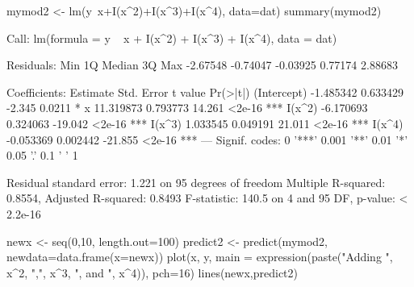 \begin{Schunk}
\begin{Sinput}
 mymod2 <- lm(y~x+I(x^2)+I(x^3)+I(x^4), data=dat)
 summary(mymod2)
\end{Sinput}
\begin{Soutput}
Call:
lm(formula = y ~ x + I(x^2) + I(x^3) + I(x^4), data = dat)

Residuals:
     Min       1Q   Median       3Q      Max 
-2.67548 -0.74047 -0.03925  0.77174  2.88683 

Coefficients:
             Estimate Std. Error t value Pr(>|t|)    
(Intercept) -1.485342   0.633429  -2.345   0.0211 *  
x           11.319873   0.793773  14.261   <2e-16 ***
I(x^2)      -6.170693   0.324063 -19.042   <2e-16 ***
I(x^3)       1.033545   0.049191  21.011   <2e-16 ***
I(x^4)      -0.053369   0.002442 -21.855   <2e-16 ***
---
Signif. codes:  0 '***' 0.001 '**' 0.01 '*' 0.05 '.' 0.1 ' ' 1

Residual standard error: 1.221 on 95 degrees of freedom
Multiple R-squared:  0.8554,	Adjusted R-squared:  0.8493 
F-statistic: 140.5 on 4 and 95 DF,  p-value: < 2.2e-16
\end{Soutput}
\begin{Sinput}
 newx <- seq(0,10, length.out=100)
 predict2 <- predict(mymod2, newdata=data.frame(x=newx))
 plot(x, y, main = expression(paste("Adding ", x^2, ",", x^3, ", and ", x^4)), pch=16)
 lines(newx,predict2)
\end{Sinput}
\end{Schunk}
